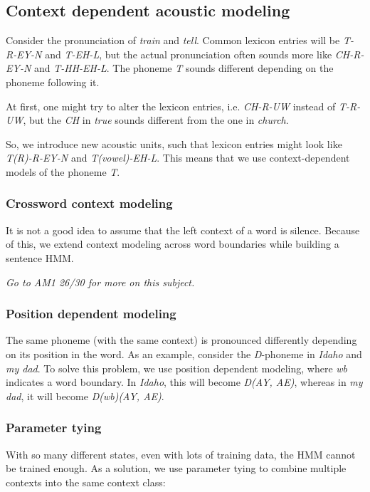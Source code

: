 \subsection{Context dependent acoustic modeling}

Consider the pronunciation of \textit{train} and \textit{tell}. Common lexicon entries will be \textit{T-R-EY-N} and \textit{T-EH-L}, but the actual pronunciation often sounds more like \textit{CH-R-EY-N} and \textit{T-HH-EH-L}. The phoneme \textit{T} sounds different depending on the phoneme following it.

At first, one might try to alter the lexicon entries, i.e. \textit{CH-R-UW} instead of \textit{T-R-UW}, but the \textit{CH} in \textit{true} sounds different from the one in \textit{church}.

So, we introduce new acoustic units, such that lexicon entries might look like \textit{T(R)-R-EY-N} and \textit{T(vowel)-EH-L}. This means that we use context-dependent models of the phoneme \textit{T}.

\subsubsection{Crossword context modeling}

It is not a good idea to assume that the left context of a word is silence. Because of this, we extend context modeling across word boundaries while building a sentence HMM.

\textit{Go to AM1 26/30 for more on this subject.}

\subsubsection{Position dependent modeling}

The same phoneme (with the same context) is pronounced differently depending on its position in the word. As an example, consider the \textit{D}-phoneme in \textit{Idaho} and \textit{my dad}. To solve this problem, we use position dependent modeling, where \textit{wb} indicates a word boundary. In \textit{Idaho}, this will become \textit{D(AY, AE)}, whereas in \textit{my dad}, it will become \textit{D(wb)(AY, AE)}.

\subsubsection{Parameter tying}

With so many different states, even with lots of training data, the HMM cannot be trained enough. As a solution, we use parameter tying to combine multiple contexts into the same context class:

